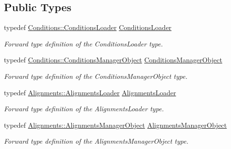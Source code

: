 \subsection*{Public Types}
\begin{DoxyCompactItemize}
\item 
typedef \hyperlink{class_d_d4hep_1_1_conditions_1_1_conditions_loader}{Conditions::ConditionsLoader} \hyperlink{class_d_d4hep_1_1_geometry_1_1_world_object_ab3186f89db27a386504504645203d688}{ConditionsLoader}
\begin{DoxyCompactList}\small\item\em Forward type definition of the ConditionsLoader type. \item\end{DoxyCompactList}\item 
typedef \hyperlink{class_d_d4hep_1_1_conditions_1_1_conditions_manager_object}{Conditions::ConditionsManagerObject} \hyperlink{class_d_d4hep_1_1_geometry_1_1_world_object_a96576e6e392fe72924c1135cc8907aec}{ConditionsManagerObject}
\begin{DoxyCompactList}\small\item\em Forward type definition of the ConditionsManagerObject type. \item\end{DoxyCompactList}\item 
typedef \hyperlink{class_d_d4hep_1_1_alignments_1_1_alignments_loader}{Alignments::AlignmentsLoader} \hyperlink{class_d_d4hep_1_1_geometry_1_1_world_object_a30113114fd4d57fb10e2c39c484813c3}{AlignmentsLoader}
\begin{DoxyCompactList}\small\item\em Forward type definition of the AlignmentsLoader type. \item\end{DoxyCompactList}\item 
typedef \hyperlink{class_d_d4hep_1_1_alignments_1_1_alignments_manager_object}{Alignments::AlignmentsManagerObject} \hyperlink{class_d_d4hep_1_1_geometry_1_1_world_object_ac5c3ed360e547df41b814ee0c5fddf9f}{AlignmentsManagerObject}
\begin{DoxyCompactList}\small\item\em Forward type definition of the AlignmentsManagerObject type. \item\end{DoxyCompactList}\end{DoxyCompactItemize}
